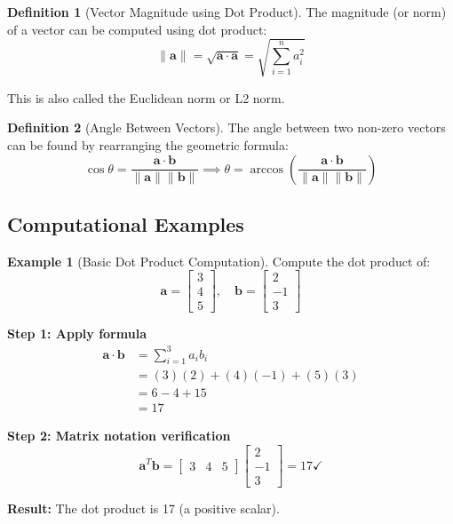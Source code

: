 \documentclass[12pt,a4paper]{article}
\theoremstyle{definition}
\newtheorem{definition}{Definition}[section]
\newtheorem{example}{Example}[section]
\begin{document}
\begin{definition}[Vector Magnitude using Dot Product]
The magnitude (or norm) of a vector can be computed using dot product:
\begin{equation}
\|\mathbf{a}\| = \sqrt{\mathbf{a} \cdot \mathbf{a}} = \sqrt{\sum_{i=1}^{n} a_i^2}
\end{equation}

This is also called the Euclidean norm or L2 norm.
\end{definition}

\begin{definition}[Angle Between Vectors]
The angle between two non-zero vectors can be found by rearranging the geometric formula:
\begin{equation}
\cos \theta = \frac{\mathbf{a} \cdot \mathbf{b}}{\|\mathbf{a}\| \|\mathbf{b}\|} \implies \theta = \arccos\left(\frac{\mathbf{a} \cdot \mathbf{b}}{\|\mathbf{a}\| \|\mathbf{b}\|}\right)
\end{equation}
\end{definition}

\subsection{Computational Examples}

\begin{example}[Basic Dot Product Computation]
Compute the dot product of:
\begin{equation}
\mathbf{a} = \begin{bmatrix} 3 \\ 4 \\ 5 \end{bmatrix}, \quad
\mathbf{b} = \begin{bmatrix} 2 \\ -1 \\ 3 \end{bmatrix}
\end{equation}

\textbf{Step 1: Apply formula}
\begin{align}
\mathbf{a} \cdot \mathbf{b} &= \sum_{i=1}^{3} a_i b_i \\
&= (3)(2) + (4)(-1) + (5)(3) \\
&= 6 - 4 + 15 \\
&= 17
\end{align}

\textbf{Step 2: Matrix notation verification}
\begin{equation}
\mathbf{a}^T\mathbf{b} = \begin{bmatrix} 3 & 4 & 5 \end{bmatrix} \begin{bmatrix} 2 \\ -1 \\ 3 \end{bmatrix} = 17 \checkmark
\end{equation}

\textbf{Result:} The dot product is 17 (a positive scalar).
\end{example}
\end{document}
